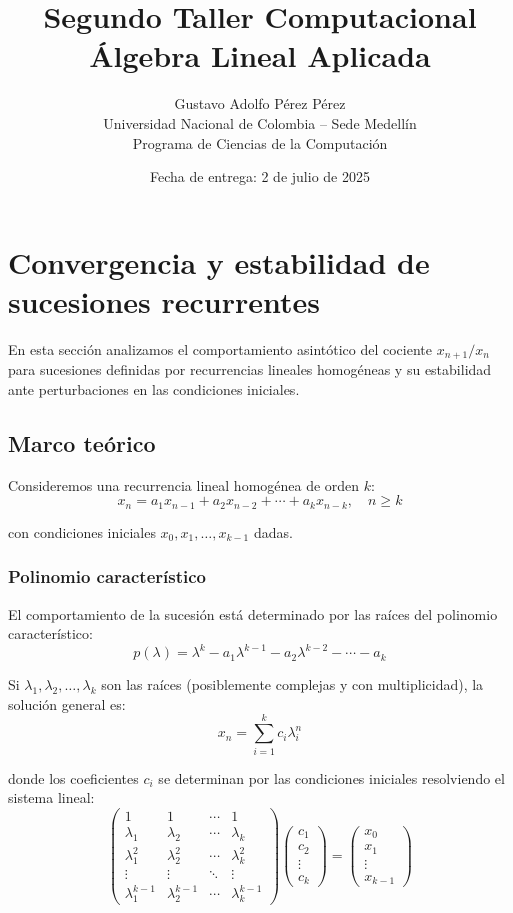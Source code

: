 \documentclass[12pt]{article}
\title{Segundo Taller Computacional\\\vspace{0.3em}Álgebra Lineal Aplicada}
\author{Gustavo Adolfo Pérez Pérez\\Universidad Nacional de Colombia -- Sede Medellín\\Programa de Ciencias de la Computación}
\date{Fecha de entrega: 2 de julio de 2025}
\begin{document}
\maketitle
\tableofcontents
\newpage

\section{Convergencia y estabilidad de sucesiones recurrentes}

En esta sección analizamos el comportamiento asintótico del cociente $x_{n+1}/x_n$ para sucesiones definidas por recurrencias lineales homogéneas y su estabilidad ante perturbaciones en las condiciones iniciales.

\subsection{Marco teórico}

Consideremos una recurrencia lineal homogénea de orden $k$:
\[
x_n = a_1 x_{n-1} + a_2 x_{n-2} + \cdots + a_k x_{n-k}, \quad n \geq k
\]

con condiciones iniciales $x_0, x_1, \ldots, x_{k-1}$ dadas.

\subsubsection{Polinomio característico}

El comportamiento de la sucesión está determinado por las raíces del polinomio característico:
\[
p(\lambda) = \lambda^k - a_1 \lambda^{k-1} - a_2 \lambda^{k-2} - \cdots - a_k
\]

Si $\lambda_1, \lambda_2, \ldots, \lambda_k$ son las raíces (posiblemente complejas y con multiplicidad), la solución general es:
\[
x_n = \sum_{i=1}^{k} c_i \lambda_i^n
\]

donde los coeficientes $c_i$ se determinan por las condiciones iniciales resolviendo el sistema lineal:
\[
\begin{pmatrix}
1 & 1 & \cdots & 1 \\
\lambda_1 & \lambda_2 & \cdots & \lambda_k \\
\lambda_1^2 & \lambda_2^2 & \cdots & \lambda_k^2 \\
\vdots & \vdots & \ddots & \vdots \\
\lambda_1^{k-1} & \lambda_2^{k-1} & \cdots & \lambda_k^{k-1}
\end{pmatrix}
\begin{pmatrix}
c_1 \\ c_2 \\ \vdots \\ c_k
\end{pmatrix}
=
\begin{pmatrix}
x_0 \\ x_1 \\ \vdots \\ x_{k-1}
\end{pmatrix}
\]
\end{document}
